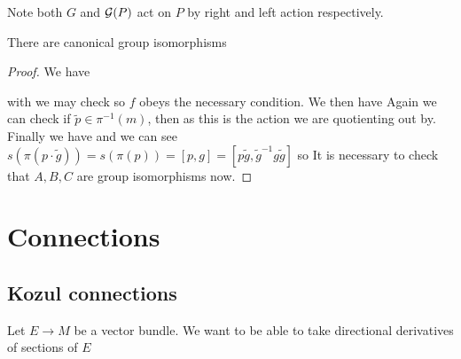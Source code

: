 \documentclass{article}
\begin{document}
\begin{remark}
Note both $G$ and $\mathcal{G}(P)$ act on $P$ by right and left action respectively. 
\end{remark}

\begin{theorem}
There are canonical group isomorphisms 
\end{theorem}
\begin{proof}
We have 
\begin{center}
\end{center}
with 
we may check 
so $f$ obeys the necessary condition. We then have 
Again we can check if $\tilde{p} \in \pi^{-1}(m)$, then 
as this is the action we are quotienting out by. Finally we have 
and we can see $s(\pi(p \cdot \tilde{g})) = s(\pi(p)) = [p,g] = [p\tilde{g},\tilde{g}^{-1}g \tilde{g}]$ so
It is necessary to check that $A,B,C$ are group isomorphisms now. 
\end{proof}

\section{Connections}

\subsection{Kozul connections}
Let $ E \to M$ be a vector bundle. We want to be able to take directional derivatives of sections of $E$
\end{document}
